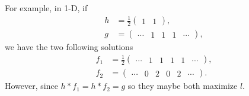 For example, in 1-D, if
\begin{align*}
  h & = \frac{1}{2}
  \begin{pmatrix}
    1 & 1
  \end{pmatrix},\\
  g & =
  \begin{pmatrix}
    \cdots & 1 & 1 & 1 & \cdots
  \end{pmatrix},
\end{align*}
we have the two following solutions
\begin{align*}
  f_1 & = \frac{1}{2}
  \begin{pmatrix}
    \cdots & 1 & 1 & 1 & 1 & \cdots
  \end{pmatrix},\\
  f_2 & =
  \begin{pmatrix}
    \cdots & 0 & 2 & 0 & 2 & \cdots
  \end{pmatrix}.
\end{align*}
However, since $h * f_1 = h * f_2 = g$ so they maybe both maximize $l$.

